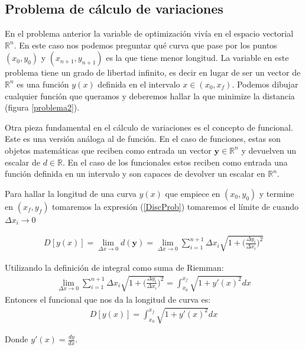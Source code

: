 \subsection{Problema de cálculo de variaciones}

En el problema anterior la variable de optimización vivía en el espacio vectorial $\mathbb{R}^n$. En este caso nos podemos preguntar qué curva que pase por los puntos $(x_0,y_0)$ y $(x_{n+1},y_{n+1})$ es la que tiene menor longitud. La variable en este problema tiene un grado de libertad infinito, es decir en lugar de ser un vector de $\mathbb{R}^n$ es una función $y(x)$ definida en el intervalo $x \in (x_0,x_f)$. Podemos dibujar cualquier función que queramos y deberemos hallar la que minimize la distancia (figura \ref{problema2}). 

Otra pieza fundamental en el cálculo de variaciones es el concepto de funcional. Este es una versión análoga al de función. En el caso de funciones, estas son objetos matemáticas que reciben como entrada un vector  $\bm{y} \in \mathbb{R}^n$ y devuelven un escalar de $d \in \mathbb{R}$. En el caso de los funcionales estos reciben como entrada una función definida en un intervalo y son capaces de devolver un escalar en $\mathbb{R}^n$.

Para hallar la longitud de una curva $y(x)$ que empiece en $(x_0,y_0)$ y termine en $(x_f,y_f)$ tomaremos la expresión (\ref{DiscProb}) tomaremos el límite de cuando $\Delta x_i \rightarrow 0 $


\begin{eqnarray}    
    D[y(x)] = \lim_{\Delta x \rightarrow 0 } d(\bm{y}) = 
    \lim_{\Delta x \rightarrow 0 } \sum_{i=1}^{n+1}  \Delta x_i \sqrt{1 + \Bigg( \frac{\Delta y_i}{\Delta x_i } \Bigg)^2 }
\end{eqnarray}

Utilizando la definición de integral como suma de Riemman:
\begin{eqnarray}      
    \lim_{\Delta x \rightarrow 0 } \sum_{i=1}^{n+1}  \Delta x_i \sqrt{1 + \Bigg( \frac{\Delta y_i}{\Delta x_i } \Bigg)^2 } =
     \int_{x_0}^{x_f}  \sqrt{1 + y'(x) ^2 }  dx 
\end{eqnarray}
Entonces el funcional que nos da la longitud de curva es:
\begin{eqnarray}    
    D[y(x)] =      \int_{x_0}^{x_f}  \sqrt{1 + y'(x) ^2 }  dx 
\end{eqnarray}

Donde $y'(x) = \frac{dy}{dx}$.
\newline



